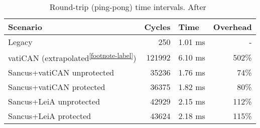 \begin{table}[h]
    \centering
    \begin{tabular}{@{}lrrr@{}}
    \toprule
    \textbf{Scenario}          & \multicolumn{1}{l}{\textbf{Cycles}} & \multicolumn{1}{l}{\textbf{Time}} & \multicolumn{1}{l}{\textbf{Overhead}} \\ \midrule
    Legacy                     & 250                                 & 1.01 ms                           & -                                     \\
    vatiCAN (extrapolated\textsuperscript{\ref{footnote-label}})    & 121992                              & 6.10 ms                           & 502\%                                 \\
    Sancus+vatiCAN unprotected & 35236                               & 1.76 ms                           & 74\%                                  \\
    Sancus+vatiCAN protected   & 36375                               & 1.82 ms                           & 80\%                                  \\
    Sancus+LeiA unprotected    & 42929                               & 2.15 ms                           & 112\%                                 \\
    Sancus+LeiA protected      & 43624                               & 2.18 ms                           & 115\%                                 \\ \bottomrule
    \end{tabular}
    \caption{Round-trip (ping-pong) time intervals. After~\cite{VanBulck2017}}
\end{table}